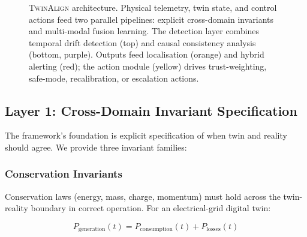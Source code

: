 \documentclass[sigconf,nonacm]{acmart}
\begin{document}
\begin{figure}[t]
\caption{\textsc{TwinAlign} architecture. Physical telemetry, twin
  state, and control actions feed two parallel pipelines: explicit
  cross-domain invariants and multi-modal fusion learning. The
  detection layer combines temporal drift detection (top) and
  causal consistency analysis (bottom, purple). Outputs feed
  localisation (orange) and hybrid alerting (red); the action
  module (yellow) drives trust-weighting, safe-mode, recalibration,
  or escalation actions.}
\label{fig:framework}
\end{figure}

\subsection{Layer 1: Cross-Domain Invariant Specification}

The framework's foundation is explicit specification of when twin
and reality should agree. We provide three invariant
families:

\subsubsection{Conservation Invariants}

Conservation laws (energy, mass, charge, momentum) must hold
across the twin-reality boundary in correct operation. For an
electrical-grid digital twin:

\begin{equation}
  P_{\text{generation}}(t) = P_{\text{consumption}}(t) + P_{\text{losses}}(t)
\end{equation}
\end{document}
